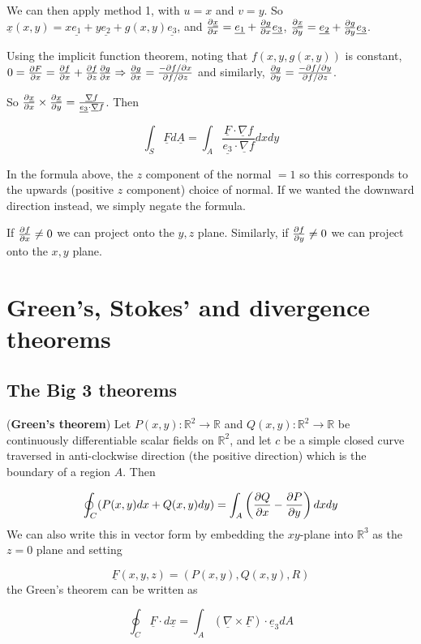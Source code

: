 \begin{definition}
\begin{enumerate}
		We can then apply method 1, with $u = x$ and $v = y$. So $\underline{x}(x, y) = x \underline{e_1} + y \underline{e_2} + g(x, y) \underline{e_3}$, and $\diffp{\underline{x}}{x} = \underline{e_1} + \diffp{g}{x} \underline{e_3}$, $\diffp{\underline{x}}{y} = \underline{e_2} + \diffp{g}{y} \underline{e_3}$.

		Using the implicit function theorem, noting that $f(x, y, g(x, y))$ is constant, $0 = \diffp{F}{x} = \diffp{f}{x} + \diffp{f}{z} \diffp{g}{x} \Rightarrow \diffp{g}{x} = \frac{-\partial f / \partial x}{\partial f / \partial z}$ and similarly, $\diffp{g}{y} = \frac{-\partial f / \partial y}{\partial f / \partial z}$.

		So $\diffp{\underline{x}}{x} \times \diffp{\underline{x}}{y} = \frac{\underline{\nabla}f}{\underline{e_3} \cdot \underline{\nabla}f}$. Then

		\[ \int_S \underline{F} d\underline{A} = \int_A \frac{\underline{F} \cdot \underline{\nabla}f}{\underline{e_3} \cdot \underline{\nabla}f} dx dy \]
	\end{enumerate}
\end{definition}

\begin{remark}
	In the formula above, the $z$ component of the normal $= 1$ so this corresponds to the upwards (positive $z$ component) choice of normal. If we wanted the downward direction instead, we simply negate the formula.

	If $\diffp{f}{x} \ne 0$ we can project onto the $y, z$ plane. Similarly, if $\diffp{f}{y} \ne 0$ we can project onto the $x, y$ plane.
\end{remark}

\section{Green's, Stokes' and divergence theorems}

\subsection{The Big 3 theorems}

\begin{theorem}
	(\textbf{Green's theorem}) Let $P(x, y): \mathbb{R}^2 \rightarrow \mathbb{R}$ and $Q(x, y): \mathbb{R}^2 \rightarrow \mathbb{R}$ be continuously differentiable scalar fields on $\mathbb{R}^2$, and let $c$ be a simple closed curve traversed in anti-clockwise direction (the positive direction) which is the boundary of a region $A$. Then
	
	\[\oint_C (P(x, y) dx + Q(x, y) dy) = \int_A \left( \diffp{Q}{x} - \diffp{P}{y} \right) dx dy \]
	We can also write this in vector form by embedding the $xy$-plane into $\mathbb{R}^3$ as the $z = 0$ plane and setting

	\[ \underline{F}(x, y, z) = (P(x, y), Q(x, y), R) \]
	the Green's theorem can be written as

	\[ \oint_C \underline{F} \cdot d\underline{x} = \int_A \left( \underline{\nabla} \times \underline{F} \right) \cdot \underline{e}_3 dA \]
\end{theorem}

